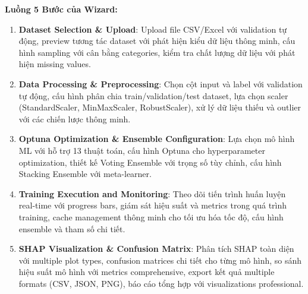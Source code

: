 \textbf{Luồng 5 Bước của Wizard:}
\begin{enumerate}[leftmargin=*]
    \item \textbf{Dataset Selection \& Upload}: Upload file CSV/Excel với validation tự động, preview tương tác dataset với phát hiện kiểu dữ liệu thông minh, cấu hình sampling với cân bằng categories, kiểm tra chất lượng dữ liệu với phát hiện missing values.
    
    \item \textbf{Data Processing \& Preprocessing}: Chọn cột input và label với validation tự động, cấu hình phân chia train/validation/test dataset, lựa chọn scaler (StandardScaler, MinMaxScaler, RobustScaler), xử lý dữ liệu thiếu và outlier với các chiến lược thông minh.
    
    \item \textbf{Optuna Optimization \& Ensemble Configuration}: Lựa chọn mô hình ML với hỗ trợ 13 thuật toán, cấu hình Optuna cho hyperparameter optimization, thiết kế Voting Ensemble với trọng số tùy chỉnh, cấu hình Stacking Ensemble với meta-learner.
    
    \item \textbf{Training Execution and Monitoring}: Theo dõi tiến trình huấn luyện real-time với progress bars, giám sát hiệu suất và metrics trong quá trình training, cache management thông minh cho tối ưu hóa tốc độ, cấu hình ensemble và tham số chi tiết.
    
    \item \textbf{SHAP Visualization \& Confusion Matrix}: Phân tích SHAP toàn diện với multiple plot types, confusion matrices chi tiết cho từng mô hình, so sánh hiệu suất mô hình với metrics comprehensive, export kết quả multiple formats (CSV, JSON, PNG), báo cáo tổng hợp với visualizations professional.
\end{enumerate}

